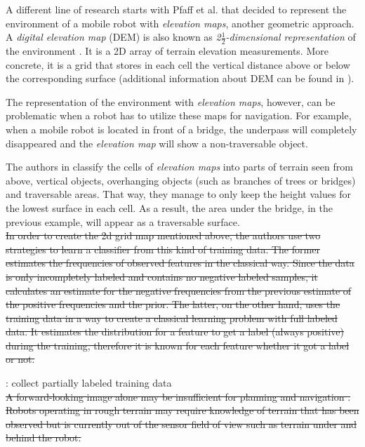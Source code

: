 \documentclass[12pt,a4paper]{report}
\newcommand{\term}{\textit}
\newcommand{\acronym}{\MakeUppercase}
\newcommand{\itfrac}[2]{\frac{\textit{#1}}{\textit{#2}}}
\begin{document}
	
	A different line of research starts with Pfaff et al. that decided to represent 
	the environment of a mobile robot with \term{elevation maps}, another geometric 
	approach. A \term{digital elevation map} (\acronym{dem}) is also known as 
	\term{2\(\itfrac{1}{2}\)-dimensional representation} of the environment 
	\cite{Pfaff}. It is a \acronym{2d} array of terrain elevation measurements. More 
	concrete, it is a grid that stores in each cell the vertical distance above or 
	below the corresponding surface (additional information about \acronym{dem} can 
	be found in \cite{Kweon}). 
	\par 
	The representation of the environment with \term{elevation maps}, however, can 
	be problematic when a robot has to utilize these maps for navigation. For 
	example, when a mobile robot is located in front of a bridge, the underpass will 
	completely disappeared and the \term{elevation map} will show a non-traversable 
	object.
	\par
	The authors in \cite{Pfaff} classify the cells of \term{elevation maps} into 
	parts of terrain seen from above, vertical objects,	overhanging objects (such as 
	branches of trees or bridges) and traversable areas. That way, they manage to 
	only keep the height values for the lowest surface in each cell. As a result, 
	the area under the bridge, in the previous example, will appear as a traversable 
	surface.
	\\
	
	
	
	
	
	
	
	\sout{In order to create the 2d grid map mentioned above, the authors use two 
	strategies to learn a classifier from this kind of 
	training data. The former estimates the frequencies of observed	features in the 
	classical way. Since the data is only incompletely labeled and contains no 
	negative labeled samples, it calculates an estimate for the negative 
	frequencies from the previous estimate of the positive frequencies and the prior. The 
	latter, on the other hand, uses the training data in a way to create a classical 
	learning problem with full labeled data. It estimates the distribution for a 
	feature to get a label (always positive) during the training, therefore it is 
	known for each feature whether it got a label or not.}
	
	\cite{Suger}: collect partially labeled training data
	\\
	
	\sout{A forward-looking image alone may be insufficient for planning and navigation
	\cite{Kweon}. Robots operating in rough terrain may require knowledge of 
	terrain that has been observed but is currently out of the sensor field of
	view such as terrain under and behind the robot.}
	
\end{document}

